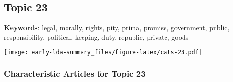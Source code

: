 \documentclass[
]{article}
\begin{document}
\newpage

\hypertarget{topic-23}{%
\subsection{Topic 23}\label{topic-23}}

\textbf{Keywords}: legal, morally, rights, pity, prima, promise,
government, public, responsibility, political, keeping, duty, republic,
private, goods

\texttt{[image: early-lda-summary\_files/figure-latex/cats-23.pdf]}
\newpage 

\hypertarget{characteristic-articles-for-topic-23}{%
\subsubsection{Characteristic Articles for Topic
23}\label{characteristic-articles-for-topic-23}}
\end{document}
